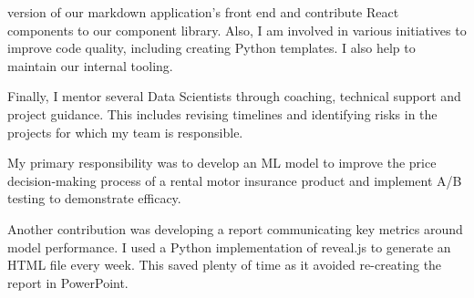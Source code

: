 \documentclass[12pt, a4paper]{awesome-cv}
\begin{document}
\begin{cventries}
{\begin{cvitems}
{  version of our markdown application's front end and contribute React components to our component library. Also, I am
  involved in various initiatives to improve code quality, including creating Python templates. I also help to maintain our internal tooling.}
\item { Finally, I mentor several Data Scientists through coaching, technical support and project guidance.
  This includes revising timelines and identifying risks in the projects for which my team is responsible.}
\end{cvitems}
\vspace{8.0mm}
      \begin{cvsubentries}
      \end{cvsubentries}
}
	{\begin{cvitems}
	\item {
My primary responsibility was to develop an ML model to improve the price decision‑making process
of a rental motor insurance product and implement A/B testing to demonstrate efficacy.
		}
	\item {
Another contribution was developing a report communicating key metrics around model performance. I used a
Python implementation of reveal.js to generate an HTML file every week. This saved plenty of time as it avoided
re-creating the report in PowerPoint.
		}
	\end{cvitems}
}
\end{cventries}

\begin{cvskills}
\end{cvskills}
\end{document}
